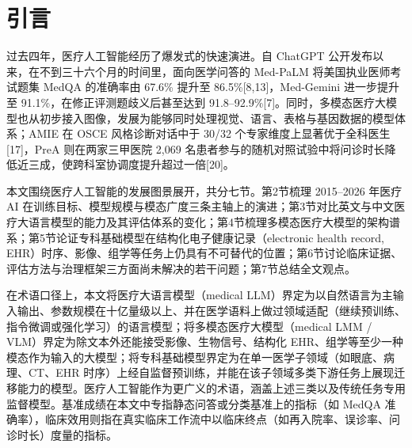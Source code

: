 \section{引言}

过去四年，医疗人工智能经历了爆发式的快速演进。自 ChatGPT 公开发布以来，在不到三十六个月的时间里，面向医学问答的 Med-PaLM 将美国执业医师考试题集 MedQA 的准确率由 67.6\% 提升至 86.5\%[8,13]，Med-Gemini 进一步提升至 91.1\%，在修正评测题歧义后甚至达到 91.8--92.9\%[7]。同时，多模态医疗大模型也从初步接入图像，发展为能够同时处理视觉、语言、表格与基因数据的模型体系；AMIE 在 OSCE 风格诊断对话中于 30/32 个专家维度上显著优于全科医生[17]，PreA 则在两家三甲医院 2,069 名患者参与的随机对照试验中将问诊时长降低近三成，使跨科室协调度提升超过一倍[20]。

本文围绕医疗人工智能的发展图景展开，共分七节。第2节梳理 2015--2026 年医疗 AI 在训练目标、模型规模与模态广度三条主轴上的演进；第3节对比英文与中文医疗大语言模型的能力及其评估体系的变化；第4节梳理多模态医疗大模型的架构谱系；第5节论证专科基础模型在结构化电子健康记录（electronic health record, EHR）时序、影像、组学等任务上仍具有不可替代的位置；第6节讨论临床证据、评估方法与治理框架三方面尚未解决的若干问题；第7节总结全文观点。

在术语口径上，本文将医疗大语言模型（medical LLM）界定为以自然语言为主输入输出、参数规模在十亿量级以上、并在医学语料上做过领域适配（继续预训练、指令微调或强化学习）的语言模型；将多模态医疗大模型（medical LMM / VLM）界定为除文本外还能接受影像、生物信号、结构化 EHR、组学等至少一种模态作为输入的大模型；将专科基础模型界定为在单一医学子领域（如眼底、病理、CT、EHR 时序）上经自监督预训练，并能在该子领域多类下游任务上展现迁移能力的模型。医疗人工智能作为更广义的术语，涵盖上述三类以及传统任务专用监督模型。基准成绩在本文中专指静态问答或分类基准上的指标（如 MedQA 准确率），临床效用则指在真实临床工作流中以临床终点（如再入院率、误诊率、问诊时长）度量的指标。
